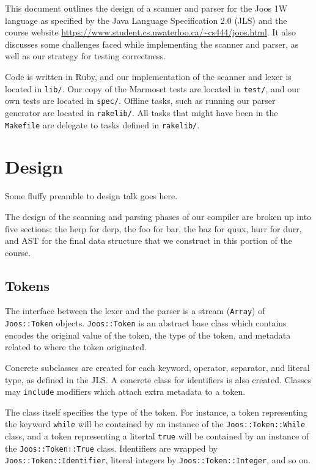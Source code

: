 \documentclass[pdftex,11pt,a4paper]{article}
\begin{document}

This document outlines the design of a scanner and parser for
the Joos 1W language as specified by the Java Language Specification
2.0 (JLS) and the course website
\url{https://www.student.cs.uwaterloo.ca/~cs444/joos.html}. It also
discusses some challenges faced while implementing the scanner and
parser, as well as our strategy for testing correctness.

Code is written in Ruby, and our implementation of the scanner and
lexer is located in \texttt{lib/}. Our copy of the Marmoset tests are
located in \texttt{test/}, and our own tests are located in
\texttt{spec/}. Offline tasks, such as running our parser generator
are located in \texttt{rakelib/}. All tasks that might have been in
the \texttt{Makefile} are delegate to tasks defined in
\texttt{rakelib/}.

\section{Design}

Some fluffy preamble to design talk goes here.

The design of the scanning and parsing phases of our compiler are
broken up into five sections: the herp for derp, the foo for bar, the
baz for quux, hurr for durr, and AST for the final data structure that
we construct in this portion of the course.


\subsection{Tokens}

The interface between the lexer and the parser is a stream
(\texttt{Array}) of \texttt{Joos::Token} objects. \texttt{Joos::Token}
is an abstract base class which contains encodes the original value of
the token, the type of the token, and metadata related to where the
token originated.

Concrete subclasses are created for each keyword, operator, separator,
and literal type, as defined in the JLS. A concrete class for
identifiers is also created. Classes may \texttt{include} modifiers
which attach extra metadata to a token.

The class itself specifies the type of the token. For instance, a
token representing the keyword \texttt{while} will be contained by an
instance of the \texttt{Joos::Token::While} class, and a token
representing a litertal \texttt{true} will be contained by an instance
of the \texttt{Joos::Token::True} class. Identifiers are wrapped by
\texttt{Joos::Token::Identifier}, literal integers by
\texttt{Joos::Token::Integer}, and so on.
\end{document}
